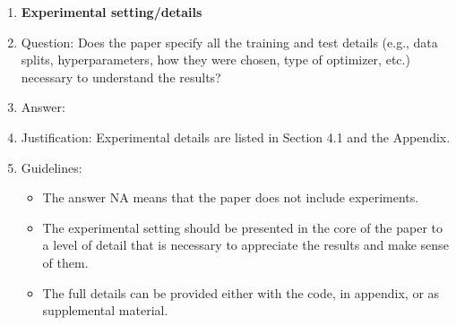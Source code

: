 \documentclass{article}
\begin{document}
\begin{enumerate}
\item {\bf Experimental setting/details}
    \item[] Question: Does the paper specify all the training and test details (e.g., data splits, hyperparameters, how they were chosen, type of optimizer, etc.) necessary to understand the results?
    \item[] Answer: \answerYes{} %
    \item[] Justification: Experimental details are listed in Section 4.1 and the Appendix.
    \item[] Guidelines:
    \begin{itemize}
        \item The answer NA means that the paper does not include experiments.
        \item The experimental setting should be presented in the core of the paper to a level of detail that is necessary to appreciate the results and make sense of them.
        \item The full details can be provided either with the code, in appendix, or as supplemental material.
    \end{itemize}


\end{enumerate}
\end{document}
